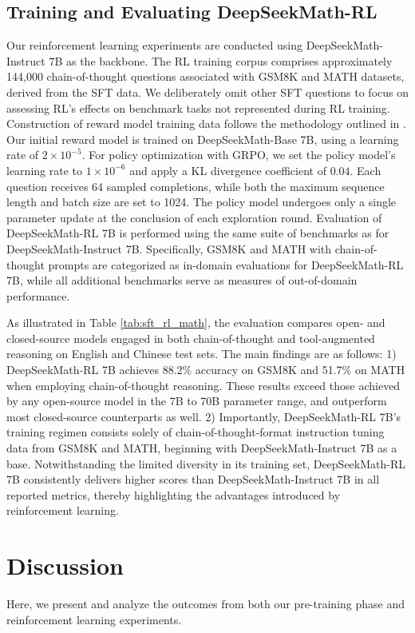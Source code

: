 \begin{itemize}[topsep=0pt]
\begin{itemize}[topsep=0pt]
\subsection{Training and Evaluating DeepSeekMath-RL}

Our reinforcement learning experiments are conducted using DeepSeekMath-Instruct 7B as the backbone. The RL training corpus comprises approximately 144,000 chain-of-thought questions associated with GSM8K and MATH datasets, derived from the SFT data. We deliberately omit other SFT questions to focus on assessing RL's effects on benchmark tasks not represented during RL training. Construction of reward model training data follows the methodology outlined in \citep{wang2023math}. Our initial reward model is trained on DeepSeekMath-Base 7B, using a learning rate of $2 \times 10^{-5}$. For policy optimization with GRPO, we set the policy model's learning rate to $1 \times 10^{-6}$ and apply a KL divergence coefficient of $0.04$. Each question receives 64 sampled completions, while both the maximum sequence length and batch size are set to 1024. The policy model undergoes only a single parameter update at the conclusion of each exploration round. Evaluation of DeepSeekMath-RL 7B is performed using the same suite of benchmarks as for DeepSeekMath-Instruct 7B. Specifically, GSM8K and MATH with chain-of-thought prompts are categorized as in-domain evaluations for DeepSeekMath-RL 7B, while all additional benchmarks serve as measures of out-of-domain performance.

As illustrated in Table \ref{tab:sft_rl_math}, the evaluation compares open- and closed-source models engaged in both chain-of-thought and tool-augmented reasoning on English and Chinese test sets. The main findings are as follows: 1) DeepSeekMath-RL 7B achieves 88.2\% accuracy on GSM8K and 51.7\% on MATH when employing chain-of-thought reasoning. These results exceed those achieved by any open-source model in the 7B to 70B parameter range, and outperform most closed-source counterparts as well. 2) Importantly, DeepSeekMath-RL 7B’s training regimen consists solely of chain-of-thought-format instruction tuning data from GSM8K and MATH, beginning with DeepSeekMath-Instruct 7B as a base. Notwithstanding the limited diversity in its training set, DeepSeekMath-RL 7B consistently delivers higher scores than DeepSeekMath-Instruct 7B in all reported metrics, thereby highlighting the advantages introduced by reinforcement learning.

\section{Discussion}
Here, we present and analyze the outcomes from both our pre-training phase and reinforcement learning experiments.


\end{itemize}
\end{itemize}
